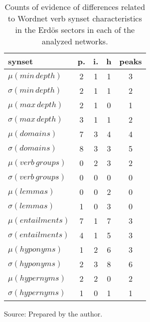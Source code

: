 \begin{table}[h!]
\begin{center}
\caption{Counts of evidence of differences related to Wordnet verb synset characteristics in the Erd\"os sectors in each of the analyzed networks.}
\begin{tabular}{| l || c | c | c || c |}\hline
{\bf synset} & {\bf p.} & {\bf i.} & {\bf h} & {\bf peaks} \\\hline\hline
$\mu(min\,depth)$ & 2  & 1  & 1  & 3 \\
$\sigma(min\,depth)$ & 2  & 1  & 1  & 2 \\\hline
$\mu(max\,depth)$ & 2  & 1  & 0  & 1 \\
$\sigma(max\,depth)$ & 3  & 1  & 1  & 2 \\\hline
$\mu(domains)$ & 7  & 3  & 4  & 4 \\
$\sigma(domains)$ & 8  & 3  & 3  & 5 \\\hline
$\mu(verb\,groups)$ & 0  & 2  & 3  & 2 \\
$\sigma(verb\,groups)$ & 0  & 0  & 0  & 0 \\\hline
$\mu(lemmas)$ & 0  & 0  & 2  & 0 \\
$\sigma(lemmas)$ & 1  & 0  & 3  & 0 \\\hline
$\mu(entailments)$ & 7  & 1  & 7  & 3 \\
$\sigma(entailments)$ & 4  & 1  & 5  & 3 \\\hline
$\mu(hyponyms)$ & 1  & 2  & 6  & 3 \\
$\sigma(hyponyms)$ & 2  & 3  & 8  & 6 \\\hline
$\mu(hypernyms)$ & 2  & 2  & 0  & 2 \\
$\sigma(hypernyms)$ & 1  & 0  & 1  & 1 \\\hline
\end{tabular}
\begin{flushleft}
		Source: Prepared by the author.\
\end{flushleft}
\end{center}
\end{table}

